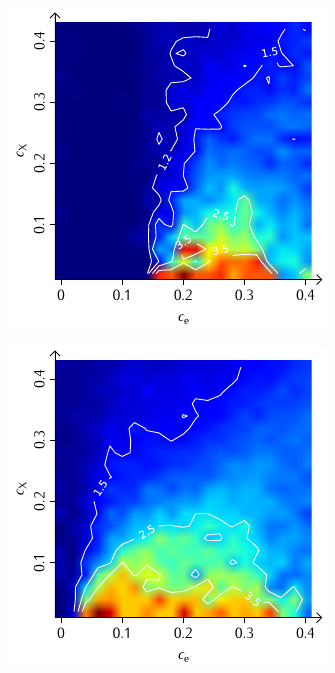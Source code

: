 \documentclass[a4paper, 10pt, twoside, openany]{book} %
\begin{document}
\begin{figure}
    \begin{minipage}[t]{0.48\textwidth}
        \includegraphics[width=\textwidth]{Abbildungen/Phasendiagramme/Konturen/H_cluster_D.pdf}
        \label{H_cluster_D}
    \end{minipage}
    \hfill
    \begin{minipage}[t]{0.48\textwidth}
        \includegraphics[width=\textwidth]{Abbildungen/Phasendiagramme/Konturen/H_penalty_cluster_D.pdf}

\end{minipage}
\end{figure}
\end{document}
